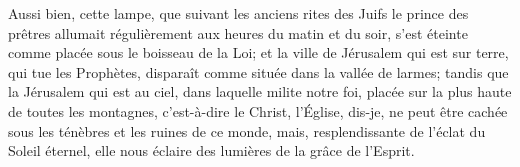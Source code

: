 Aussi bien, cette lampe,
	que suivant les anciens rites des Juifs
	le prince des prêtres allumait régulièrement aux heures du matin et du soir,
	s'est éteinte comme placée sous le boisseau de la Loi;	 
	et la ville de Jérusalem qui est sur terre, qui tue les Prophètes,
	disparaît comme située dans la vallée de larmes;
	tandis que la Jérusalem qui est au ciel, dans laquelle milite notre foi,
	placée sur la plus haute de toutes les montagnes, c'est-à-dire le Christ,
	l'Église, dis-je, ne peut être cachée sous les ténèbres et les ruines de ce monde, 
	mais, resplendissante de l'éclat du Soleil éternel,
	elle nous éclaire des lumières de la grâce de l'Esprit.